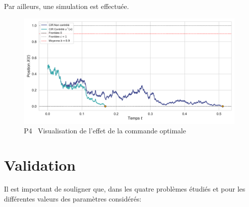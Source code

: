\FloatBarrier Par ailleurs, une simulation est effectuée. 
\begin{figure}[htb]
    \centering
    \includegraphics[width=0.9\linewidth]{img/validation/P4/p4_control_simulation.pdf}
    \caption{P4 \textemdash~Visualisation de l'effet de la commande optimale}\label{fig:Simulation4}
\end{figure}\FloatBarrier\section{Validation}
Il est important de souligner que, dans les quatre problèmes étudiés et pour les différentes valeurs des paramètres considérés:
